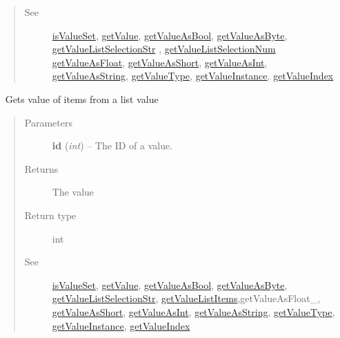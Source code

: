 \documentclass[letterpaper,10pt,english]{sphinxmanual}
\begin{document}
\begin{fulllineitems}
\begin{fulllineitems}
\begin{quote}
\begin{description}
\item[{See}] \leavevmode
{\hyperref[libopenzwave:isvalueset]{isValueSet}}, {\hyperref[libopenzwave:getvalue]{getValue}}, {\hyperref[libopenzwave:getvalueasbool]{getValueAsBool}}, {\hyperref[libopenzwave:getvalueasbyte]{getValueAsByte}}, {\hyperref[libopenzwave:getvaluelistselectionstr]{getValueListSelectionStr}} , {\hyperref[libopenzwave:getvaluelistselectionnum]{getValueListSelectionNum}} {\hyperref[libopenzwave:getvalueasfloat]{getValueAsFloat}}, {\hyperref[libopenzwave:getvalueasshort]{getValueAsShort}}, {\hyperref[libopenzwave:getvalueasint]{getValueAsInt}}, {\hyperref[libopenzwave:getvalueasstring]{getValueAsString}}, {\hyperref[libopenzwave:getvaluetype]{getValueType}}, {\hyperref[libopenzwave:getvalueinstance]{getValueInstance}}, {\hyperref[libopenzwave:getvalueindex]{getValueIndex}}

\end{description}\end{quote}

\end{fulllineitems}


\begin{fulllineitems}
\label{libopenzwave:libopenzwave.PyManager.getValueListSelectionNum}~\label{libopenzwave:getvaluelistselectionnum}
Gets value of items from a list value
\begin{quote}\begin{description}
\item[{Parameters}] \leavevmode
\textbf{id} (\emph{int}) -- The ID of a value.

\item[{Returns}] \leavevmode
The value

\item[{Return type}] \leavevmode
int

\item[{See}] \leavevmode
{\hyperref[libopenzwave:isvalueset]{isValueSet}}, {\hyperref[libopenzwave:getvalue]{getValue}}, {\hyperref[libopenzwave:getvalueasbool]{getValueAsBool}}, {\hyperref[libopenzwave:getvalueasbyte]{getValueAsByte}}, {\hyperref[libopenzwave:getvaluelistselectionstr]{getValueListSelectionStr}}, {\hyperref[libopenzwave:getvaluelistitems]{getValueListItems}},getValueAsFloat\_, {\hyperref[libopenzwave:getvalueasshort]{getValueAsShort}}, {\hyperref[libopenzwave:getvalueasint]{getValueAsInt}}, {\hyperref[libopenzwave:getvalueasstring]{getValueAsString}}, {\hyperref[libopenzwave:getvaluetype]{getValueType}}, {\hyperref[libopenzwave:getvalueinstance]{getValueInstance}}, {\hyperref[libopenzwave:getvalueindex]{getValueIndex}}


\end{description}
\end{quote}
\end{fulllineitems}
\end{fulllineitems}
\end{document}
